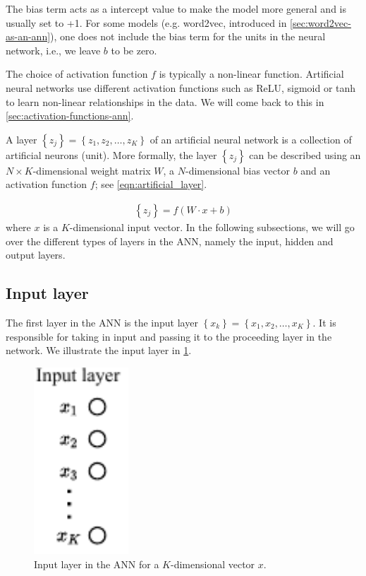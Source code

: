 The bias term acts as a intercept value to make the model more general and is usually set to +1. For some models (e.g. word2vec, introduced in \cref{sec:word2vec-as-an-ann}), one does not include the bias term for the units in the neural network, i.e., we leave $b$ to be zero.

The choice of activation function $f$ is typically a non-linear function. Artificial neural networks use different activation functions such as ReLU, sigmoid or tanh to learn non-linear relationships in the data. We will come back to this in \cref{sec:activation-functions-ann}.

\newcommand{\layer}[2]{\left\{ {#1}_{#2} \right\}}

\begin{definition}
\label{def:layer_ann}
A layer $\layer{z}{j} = \left\{ z_1, z_2, \ldots, z_K \right\}$ of an artificial neural network is a collection of artificial neurons (unit). More formally, the layer $\layer{z}{j}$ can be described using an $N \times K$-dimensional weight matrix $W$, a $N$-dimensional bias vector $b$ and an activation function $f$; see \cref{eqn:artificial_layer}.
\end{definition}

\begin{align}
    \layer{z}{j} = f \left( W \cdot x + b \right)
    \label{eqn:artificial_layer}
\end{align}
where $x$ is a $K$-dimensional input vector. In the following subsections, we will go over the different types of layers in the ANN, namely the input, hidden and output layers.

\subsection{Input layer}
\label{sec:ann-input-layer}
The first layer in the ANN is the input layer $\layer{x}{k} = \left\{ x_1, x_2, \ldots, x_K \right\}$. It is responsible for taking in input and passing it to the proceeding layer in the network. We illustrate the input layer in \cref{fig:input_layer_ann}.

\begin{figure}[H]
    \centering
    \includegraphics[height=7cm]{thesis/figures/artificial-neural-network-input-layer_cropped.pdf}
    \caption{Input layer in the ANN for a $K$-dimensional vector $x$.}
    \label{fig:input_layer_ann}
\end{figure}

